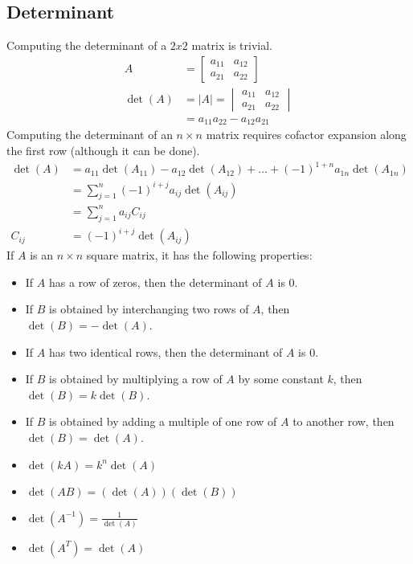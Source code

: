 \documentclass{math}
\begin{document}
\subsection*{Determinant}
Computing the determinant of a \( 2x2 \) matrix is trivial.
\begin{align*}
  A &= \begin{bmatrix}
    a_{11} & a_{12} \\
    a_{21} & a_{22}
  \end{bmatrix} \\
  \det(A) &= |A| = \begin{vmatrix}
    a_{11} & a_{12} \\
    a_{21} & a_{22}
  \end{vmatrix} \\
  &= a_{11}a_{22}-a_{12}a_{21}
\end{align*}
Computing the determinant of an \( n\times n \) matrix requires cofactor
expansion along the first row (although it can be done).
\begin{align*}
  \det(A) &=
    a_{11}\det(A_{11})-a_{12}\det(A_{12})+\dots+(-1)^{1+n}a_{1n}\det(A_{1n}) \\
  &= \sum_{j=1}^{n}(-1)^{i+j}a_{ij}\det(A_{ij}) \\
  &= \sum_{j=1}^{n}a_{ij}C_{ij} \\
  C_{ij} &= (-1)^{i+j}\det(A_{ij})
\end{align*}
If \( A \) is an \( n\times n \) square matrix, it has the following properties:
\begin{itemize}
  \item If \( A \) has a row of zeros, then the determinant of \( A \) is 0.
  \item If \( B \) is obtained by interchanging two rows of \( A \), then
    \( \det(B) = -\det(A) \).
  \item If \( A \) has two identical rows, then the determinant of \( A \) is 0.
  \item If \( B \) is obtained by multiplying a row of \( A \) by some constant
    \( k \), then \( \det(B) = k\det(B) \).
  \item If \( B \) is obtained by adding a multiple of one row of \( A \) to
    another row, then \( \det(B) = \det(A) \).
  \item \( \det(kA) = k^n\det(A) \)
  \item \( \det(AB) = (\det(A))(\det(B)) \)
  \item \( \det(A^{-1}) = \frac{1}{\det(A)} \)
  \item \( \det(A^T) = \det(A) \)
\end{itemize}
\end{document}
